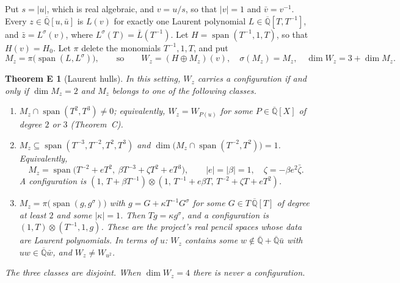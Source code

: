 \documentclass[11pt,a4paper]{article}
\theoremstyle{plain}
\newtheorem*{theoremE}{Theorem E}
\theoremstyle{definition}
\newcommand{\Qbar}{\overline{\mathbb{Q}}}
\newcommand{\spn}{\operatorname{span}}
\begin{document}
Put $s=|u|$, which is real algebraic, and $v=u/s$, so that $|v|=1$ and $\bar v=v^{-1}$.
Every $z\in\Qbar[u,\bar u]$ is $L(v)$ for exactly one Laurent polynomial
$L\in\Qbar[T,T^{-1}]$, and $\bar z=L^{\sigma}(v)$, where $L^{\sigma}(T)=\bar L(T^{-1})$. Let
$H=\spn(T^{-1},1,T)$, so that $H(v)=H_{0}$. Let $\pi$ delete the monomials $T^{-1},1,T$,
and put
\[
  M_{z}=\pi\bigl(\spn(L,L^{\sigma})\bigr),\qquad\text{so}\qquad
  W_{z}=(H\oplus M_{z})(v),\quad \sigma(M_{z})=M_{z},\quad \dim W_{z}=3+\dim M_{z}.
\]

\begin{theoremE}[Laurent hulls]
In this setting, $W_{z}$ carries a configuration if and only if $\dim M_{z}=2$ and $M_{z}$
belongs to one of the following classes.
\begin{enumerate}[label=\textup{(\Alph*)}]
\item[(P)] $M_{z}\cap\spn(T^{2},T^{3})\neq0$; equivalently, $W_{z}=W_{P(u)}$ for some
$P\in\Qbar[X]$ of degree $2$ or $3$ (Theorem~C).
\item[(Q)] $M_{z}\subseteq\spn(T^{-3},T^{-2},T^{2},T^{3})$ and
$\dim\bigl(M_{z}\cap\spn(T^{-2},T^{2})\bigr)=1$. Equivalently,
\[
  M_{z}=\spn\bigl(T^{-2}+eT^{2},\ \beta T^{-3}+\zeta T^{2}+eT^{3}\bigr),\qquad
  |e|=|\beta|=1,\quad \zeta=-\beta e^{2}\bar\zeta .
\]
A configuration is $(1,\,T+\beta T^{-1})\otimes(1,\,T^{-1}+e\beta T,\,T^{-2}+\zeta T+eT^{2})$.
\item[(R)] $M_{z}=\pi\bigl(\spn(g,g^{\sigma})\bigr)$ with $g=G+\kappa T^{-1}G^{\sigma}$ for
some $G\in T\,\Qbar[T]$ of degree at least $2$ and some $|\kappa|=1$. Then $Tg=\kappa g^{\sigma}$,
and a configuration is $(1,T)\otimes(T^{-1},1,g)$. These are the project's real pencil
spaces \cite[Prop.~10.42, Thm.~10.43]{BP} whose data are Laurent polynomials. In terms of
$u$: $W_{z}$ contains some $w\notin\Qbar+\Qbar\bar u$ with $uw\in\Qbar\bar w$, and
$W_{z}\neq W_{u^{2}}$.
\end{enumerate}
The three classes are disjoint. When $\dim W_{z}=4$ there is never a configuration.
\end{theoremE}
\end{document}
